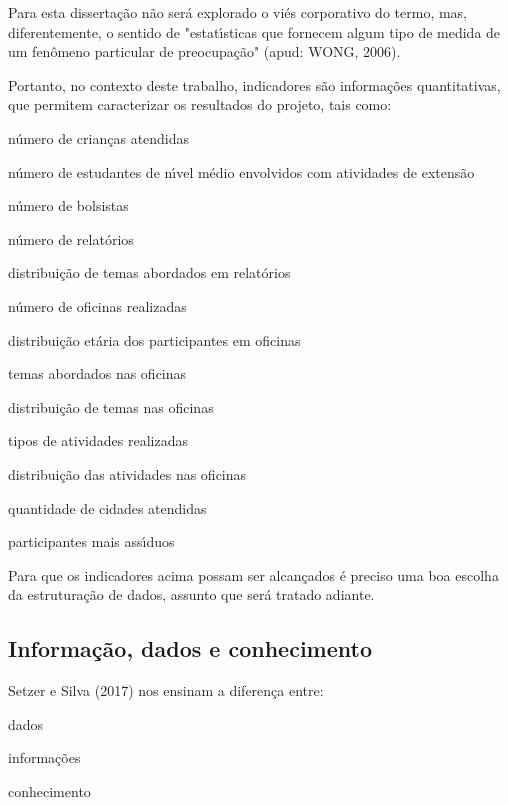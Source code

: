 \documentclass[
12pt,		%
openright,	%
twoside,  %
a4paper,			%
chapter=TITLE,		%
english,			%
french,				%
spanish,			%
brazil				%
]{USPSC-classe/USPSC}
\begin{document}
Para esta disserta\c{c}\~ao n\~ao ser\'a explorado o vi\'es corporativo do termo, mas, diferentemente, o sentido de "estat\'{\i}sticas que fornecem algum tipo de medida de um fen\^omeno particular de preocupa\c{c}\~ao" (apud: WONG, 2006).


Portanto, no contexto deste trabalho, indicadores s\~ao informa\c{c}\~oes quantitativas, que permitem caracterizar os resultados do projeto, tais como:



\begin{alineas}
\item n\'umero de crian\c{c}as atendidas
\item n\'umero de estudantes de n\'{\i}vel m\'edio envolvidos com atividades de extens\~ao
\item n\'umero de bolsistas
\item n\'umero de relat\'orios
\item distribui\c{c}\~ao de temas abordados em relat\'orios
\item n\'umero de oficinas realizadas
\item distribui\c{c}\~ao et\'aria dos participantes em oficinas
\item temas abordados nas oficinas
\item distribui\c{c}\~ao de temas nas oficinas
\item tipos de atividades realizadas
\item distribui\c{c}\~ao das atividades nas oficinas
\item quantidade de cidades atendidas
\item participantes mais ass\'{\i}duos
\end{alineas}

Para que os indicadores acima possam ser alcan\c{c}ados \'e preciso uma boa escolha da estrutura\c{c}\~ao de dados, assunto que ser\'a tratado adiante.


\subsection[Informa\c{c}\~ao, dados e conhecimento]{Informa\c{c}\~ao, dados e conhecimento}\label{Informa\c{c}\~ao, dados e conhecimento}
 Setzer e Silva (2017)  nos ensinam a diferen\c{c}a entre:



\begin{alineas}
\item dados
\item informa\c{c}\~oes
\item conhecimento
\end{alineas}
\end{document}
